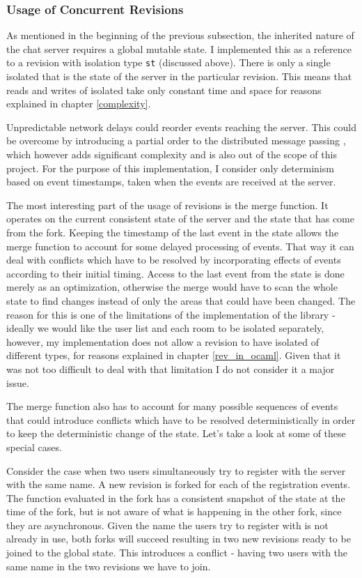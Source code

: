 \documentclass[12pt,twoside,notitlepage]{report}
\begin{document}
{\subsubsection{Usage of Concurrent Revisions}

As mentioned in the beginning of the previous subsection, the inherited nature of the chat server requires a global mutable state. I implemented this as a reference to a revision with isolation type {\tt st} (discussed above). There is only a single isolated that is the state of the server in the particular revision. This means that reads and writes of isolated take only constant time and space for reasons explained in chapter \ref{complexity}.

Unpredictable network delays could reorder events reaching the server. This could be overcome by introducing a partial order to the distributed message passing \cite{bacon}, which however adds significant complexity and is also out of the scope of this project. For the purpose of this implementation, I consider only determinism based on event timestamps, taken when the events are received at the server.

The most interesting part of the usage of revisions is the merge function. It operates on the current consistent state of the server and the state that has come from the fork. Keeping the timestamp of the last event in the state allows the merge function to account for some delayed processing of events. That way it can deal with conflicts which have to be resolved by incorporating effects of events according to their initial timing. Access to the last event from the state is done merely as an optimization, otherwise the merge would have to scan the whole state to find changes instead of only the areas that could have been changed. The reason for this is one of the limitations of the implementation of the library - ideally we would like the user list and each room to be isolated separately, however, my implementation does not allow a revision to have isolated of different types, for reasons explained in chapter \ref{rev_in_ocaml}. Given that it was not too difficult to deal with that limitation I do not consider it a major issue. 

The merge function also has to account for many possible sequences of events that could introduce conflicts which have to be resolved deterministically in order to keep the deterministic change of the state. Let's take a look at some of these special cases.

Consider the case when two users simultaneously try to register with the server with the same name. A new revision is forked for each of the registration events. The function evaluated in the fork has a consistent snapshot of the state at the time of the fork, but is not aware of what is happening in the other fork, since they are asynchronous. Given the name the users try to register with is not already in use, both forks will succeed resulting in two new revisions ready to be joined to the global state. This introduces a conflict - having two users with the same name in the two revisions we have to join. 

}
\end{document}
